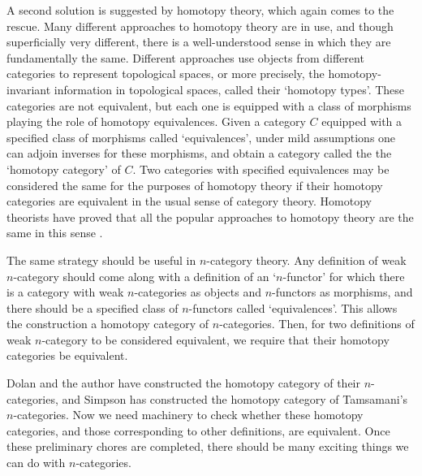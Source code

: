 A second solution is suggested by homotopy theory, which again comes to
the rescue.  Many different approaches to homotopy theory are in use,
and though superficially very different, there is a well-understood
sense in which they are fundamentally the same.  Different approaches
use objects from different categories to represent topological spaces,
or more precisely, the homotopy-invariant information in topological
spaces, called their `homotopy types'.  These categories are not
equivalent, but each one is equipped with a class of morphisms playing
the role of homotopy equivalences.  Given a category $C$ equipped with a
specified class of morphisms called `equivalences', under mild
assumptions one can adjoin inverses for these morphisms, and obtain a
category called the the `homotopy category' of $C$.  Two categories with
specified equivalences may be considered the same for the purposes of
homotopy theory if their homotopy categories are equivalent in the usual
sense of category theory.  Homotopy theorists have proved that all the
popular approaches to homotopy theory are the same in this sense
\cite{Baues}.

The same strategy should be useful in $n$-category theory.  Any
definition of weak $n$-category should come along with a definition of
an `$n$-functor' for which there is a category with weak $n$-categories
as objects and $n$-functors as morphisms, and there should be a
specified class of $n$-functors called `equivalences'.  This allows the
construction a homotopy category of $n$-categories.  Then, for two
definitions of weak $n$-category to be considered equivalent, we
require that their homotopy categories be equivalent.

Dolan and the author have constructed the homotopy category of their
$n$-categories, and Simpson \cite{Simpson} has constructed the homotopy
category of Tamsamani's $n$-categories.  Now we need machinery to check
whether these homotopy categories, and those corresponding to other
definitions, are equivalent.  Once these preliminary chores are
completed, there should be many exciting things we can do with
$n$-categories.  

